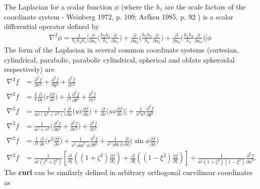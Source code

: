 The Laplacian for a scalar function $\phi$ (where the $h_i$ are the scale factors of the coordinate system - Weinberg 1972, p. 109; Arfken 1985, p. 92 \cite{bib:Wolfram}) is a scalar differential operator defined by
\begin{align}
	\nabla^2 \phi = \frac{1}{h_1h_2h_3} \bigg[	\frac{\partial}{\partial u_1} \bigg( \frac{h_2h_3}{h_1} \frac{\partial}{\partial u_1} \bigg) + \frac{\partial}{\partial u_2} \bigg( \frac{h_1h_3}{h_2} \frac{\partial}{\partial u_2} \bigg) + \frac{\partial}{\partial u_3} \bigg( \frac{h_1h_2}{h_3} \frac{\partial}{\partial u_3} \bigg) \bigg] \phi
\end{align}
The form of the Laplacian in several common coordinate systems (cartesian, cylindrical, parabolic, parabolic cylindrical, spherical and oblate spheroidal respectively) are
\begin{align}
	\nabla^2 f &= \frac{\partial^2 f}{\partial x^2}+ \frac{\partial^2 f}{\partial y^2}+ \frac{\partial^2 f}{\partial z^2} \\
	\nabla^2 f &=\frac{1}{r}\frac{\partial}{\partial r}\bigg(r \frac{\partial f}{\partial r}\bigg)+\frac{1}{r^2}\frac{\partial^2 f}{\partial \theta^2}+\frac{\partial^2 f}{\partial z^2} \\
	\nabla^2 f &= \frac{1}{uv(u^2+v^2)}\bigg[\frac{\partial}{\partial u}\bigg( uv\frac{\partial f}{\partial u} \bigg) + \frac{\partial}{\partial v}\bigg(u v \frac{\partial f}{\partial v}\bigg)\bigg]+\frac{1}{v^2u^2}\frac{\partial^2 f}{\partial \theta^2} \\
	\nabla^2 f &= \frac{1}{u^2+v^2}\bigg(\frac{\partial^2 f}{\partial u^2}+\frac{\partial^2 f}{\partial v^2} \bigg)+\frac{\partial^2 f}{\partial z^2} \\
	\nabla^2 f &= \frac{1}{r^2} \frac{\partial}{\partial r}\bigg(r^2 \frac{\partial f}{\partial r} \bigg)+\frac{1}{r^2 \sin^2 \phi}\frac{\partial^2 f}{\partial \theta^2} +\frac{1}{r^2\sin\phi}\frac{\partial}{\partial\phi}\bigg(\sin\phi \frac{\partial f}{\partial \phi} \bigg) \\
	\nabla^2 f&= \frac{1}{a^2(\zeta^2+\xi^2)}\left[\frac{\partial}{\partial \zeta}\left((1+\zeta^2)\frac{\partial f}{\partial \zeta}\right) +\frac{\partial}{\partial \xi}\left((1-\xi^2)\frac{\partial f}{\partial \xi}\right) \right] +\frac{1}{a^2(1+\zeta^2)(1-\xi^2)} \frac{\partial^2 f}{\partial \phi^2}.
\end{align}
The \textbf{curl} can be similarly defined in arbitrary orthogonal curvilinear coordinates as
